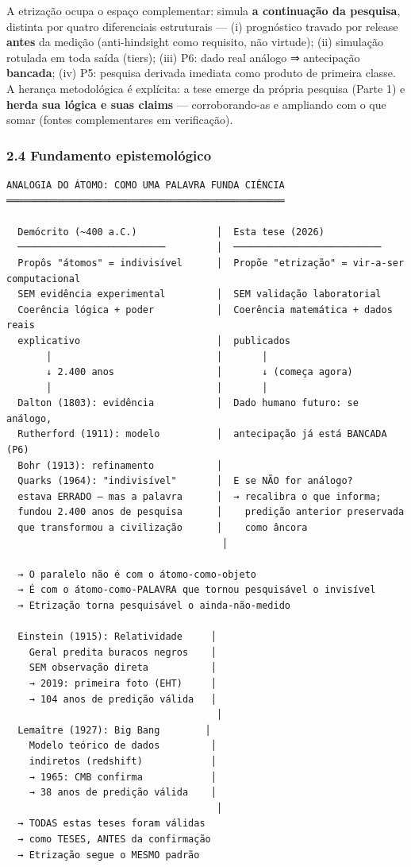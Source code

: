 \documentclass[
  10pt,
]{article}
\begin{document}
A etrização ocupa o espaço complementar: simula \textbf{a continuação da
pesquisa}, distinta por quatro diferenciais estruturais --- (i)
prognóstico travado por release \textbf{antes} da medição
(anti-hindsight como requisito, não virtude); (ii) simulação rotulada em
toda saída (tiers); (iii) P6: dado real análogo ⇒ antecipação
\textbf{bancada}; (iv) P5: pesquisa derivada imediata como produto de
primeira classe. A herança metodológica é explícita: a tese emerge da
própria pesquisa (Parte 1) e \textbf{herda sua lógica e suas claims} ---
corroborando-as e ampliando com o que somar (fontes complementares em
verificação).

\hypertarget{fundamento-epistemoluxf3gico}{%
\subsubsection{2.4 Fundamento
epistemológico}\label{fundamento-epistemoluxf3gico}}

\begin{verbatim}
ANALOGIA DO ÁTOMO: COMO UMA PALAVRA FUNDA CIÊNCIA
═════════════════════════════════════════════════

  Demócrito (~400 a.C.)              │  Esta tese (2026)
  ──────────────────────────         │  ──────────────────────────
  Propôs "átomos" = indivisível      │  Propõe "etrização" = vir-a-ser computacional
  SEM evidência experimental         │  SEM validação laboratorial
  Coerência lógica + poder           │  Coerência matemática + dados reais
  explicativo                        │  publicados
       │                             │       │
       ↓ 2.400 anos                  │       ↓ (começa agora)
       │                             │       │
  Dalton (1803): evidência           │  Dado humano futuro: se análogo,
  Rutherford (1911): modelo          │  antecipação já está BANCADA (P6)
  Bohr (1913): refinamento           │
  Quarks (1964): "indivisível"       │  E se NÃO for análogo?
  estava ERRADO — mas a palavra      │  → recalibra o que informa;
  fundou 2.400 anos de pesquisa      │    predição anterior preservada
  que transformou a civilização      │    como âncora
                                      │

  → O paralelo não é com o átomo-como-objeto
  → É com o átomo-como-PALAVRA que tornou pesquisável o invisível
  → Etrização torna pesquisável o ainda-não-medido

  Einstein (1915): Relatividade     │
    Geral predita buracos negros    │
    SEM observação direta           │
    → 2019: primeira foto (EHT)     │
    → 104 anos de predição válida   │
                                     │
  Lemaître (1927): Big Bang        │
    Modelo teórico de dados         │
    indiretos (redshift)            │
    → 1965: CMB confirma            │
    → 38 anos de predição válida    │
                                     │
  → TODAS estas teses foram válidas
  → como TESES, ANTES da confirmação
  → Etrização segue o MESMO padrão
\end{verbatim}
\end{document}
